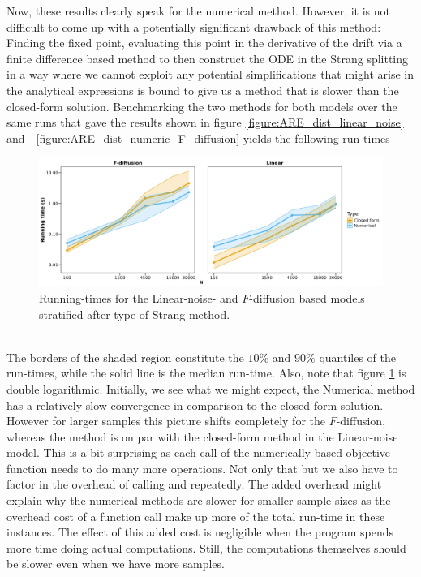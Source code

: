 Now, these results clearly speak for the numerical method. However, it is not difficult to come up with a potentially significant drawback of this method: Finding the fixed point, evaluating this point in the derivative of the drift via a finite difference based method to then construct the ODE in the Strang splitting in a way where we cannot exploit any potential simplifications that might arise in the analytical expressions is bound to give us a method that is slower than the closed-form solution. Benchmarking the two methods for both models over the same runs that gave the results shown in figure \ref{figure:ARE_dist_linear_noise} and - \ref{figure:ARE_dist_numeric_F_diffusion} yields the following run-times
\begin{figure}[h!]
    \begin{center}
    \includegraphics[scale = .09]{figures/Running_result_numeric.jpeg}
    \caption{Running-times for the Linear-noise- and $F$-diffusion based models stratified after type of Strang method.} 
    \label{figure:running_result_numeric}       
    \end{center}
\end{figure}\\
The borders of the shaded region constitute the $10\%$ and $90\%$ quantiles of the run-times, while the solid line is the median run-time. Also, note that figure \ref{figure:running_result_numeric} is double logarithmic. Initially, we see what we might expect, the Numerical method has a relatively slow convergence in comparison to the closed form solution. However for larger samples this picture shifts completely for the $F$-diffusion, whereas the method is on par with the closed-form method in the Linear-noise model. This is a bit surprising as each call of the numerically based objective function needs to do many more operations. Not only that but we also have to factor in the overhead of calling  and  repeatedly. The added overhead might explain why the numerical methods are slower for smaller sample sizes as the overhead cost of a function call make up more of the total run-time in these instances. The effect of this added cost is negligible when the program spends more time doing actual computations. Still, the computations themselves should be slower even when we have more samples. \\\\
